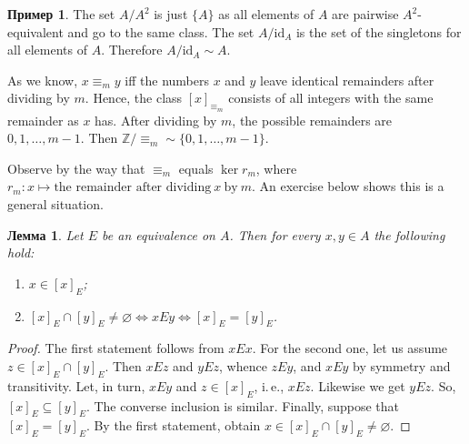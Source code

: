 \documentclass[12pt,notitlepage]{article}
\theoremstyle{plain}
\newtheorem{lemma}[thm]{Лемма}
\theoremstyle{definition}
\newtheorem{exm}[thm]{Пример}
\theoremstyle{plain}
\newcommand{\Z}{\mathbb{Z}}
\newcommand{\R}{\mathbb{R}}
\newcommand{\sbs}{\subseteq}
\newcommand{\void}{\varnothing}
\newcommand{\rng}{\mathop{\mathrm{rng}}}
\newcommand{\id}{\mathrm{id}}
\newcommand{\1}{\mathbf{1}}
\newcommand{\0}{\mathbf{0}}
\begin{document}
\begin{exm}
	The set $A / A^2$ is just $\{A\}$ as all elements of $A$ are pairwise $A^2$-equivalent and go to the same class. The set $A / \id_A$ is the set of the singletons for all elements of $A$. Therefore $A / \id_A \sim A$.
	
	As we know, $x \equiv_m y$ iff the numbers $x$ and $y$ leave identical remainders after dividing by $m$. Hence, the class $[x]_{\equiv_m}$ consists of all integers with the same remainder as $x$ has. After dividing by $m$, the possible remainders are $0,1,\ldots,m - 1$. Then $\Z / {\equiv_m} \sim \{0,1,\ldots,m - 1\}$.
	
	Observe by the way that $\equiv_m$ equals $\ker r_m$, where  $r_m \colon x \mapsto \mbox{the remainder after dividing}\ x\ \mbox{by}\ m$. An exercise below shows this is a general situation.
	
\end{exm}


\begin{lemma}\label{ch0:eq_class}
	Let $E$ be an equivalence on $A$. Then for every $x,y\in A$ the following hold:
	\begin{enumerate}
		\item $x \in [x]_E$;
		\item $[x]_E \cap [y]_E \neq \void \iff xEy \iff [x]_E = [y]_E$.
	\end{enumerate}
\end{lemma}
\begin{proof}
	The first statement follows from $xEx$. For the second one, let us assume $z \in [x]_E \cap [y]_E$. Then $x E z$ and $y E z$, whence $z E y$, and $x E y$ by symmetry and transitivity. Let, in turn, $x E y$  and $z \in [x]_E$, i.\,e., $x E z$. Likewise we get $y E z$. So, $[x]_E \sbs [y]_E$. The converse inclusion is similar. Finally, suppose that $[x]_E = [y]_E$. By the first statement, obtain $x \in [x]_E \cap [y]_E \neq \void$.
\end{proof}
\end{document}
